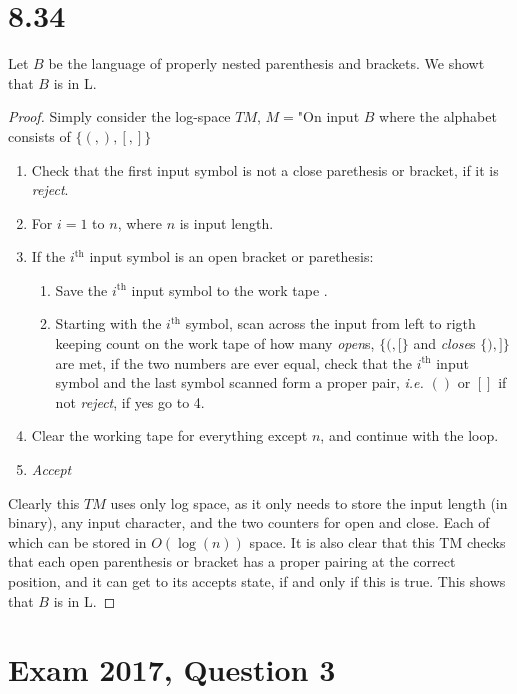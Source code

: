 \documentclass[a4paper,11pt]{article}
\newcommand{\ie}{\emph{i.e.} }
\numberwithin{equation}{section}
\begin{document}
	\section*{8.34} 
	Let $ B $ be the language of properly nested parenthesis and brackets. We showt that $ B $ is in L.
	\begin{proof}
	Simply consider the log-space $ TM $, $ M= $"On input $ B $ where the alphabet consists of $ \{(,),[,]\} $
	\renewcommand{\labelenumii}{(\roman{enumii})}
	\begin{enumerate}
		\item Check that the first input symbol is not a close parethesis or bracket, if it is \emph{reject}.
		\item For $ i=1 $ to $ n $, where $ n $ is input length.
		\item\quad If the $ i^{\text{th}} $ input symbol is an open bracket or parethesis: 
		\begin{addmargin}[2em]{0em} 
		\begin{enumerate}
				\item Save the $ i^{\text{th}} $ input symbol to the work tape .
				\item Starting with the $ i^{\text{th}} $ symbol, scan across the input from left to rigth keeping count on the work tape of how many \emph{open}s, $ \{(,[ \} $ and \emph{close}s $ \{),]\} $ are met, if the two numbers are ever equal, check that the $ i^{\text{th}} $ input symbol and the last symbol scanned form a proper pair, \ie $ () $ or $ [] $ if not \emph{reject}, if yes go to 4.
		\end{enumerate}
	\end{addmargin}
		\item \quad Clear the working tape for everything except $ n $, and continue with the loop.
		\item \emph{Accept}
	\end{enumerate}
	Clearly this $ TM $ uses only log space, as it only needs to store the input length (in binary), any input character, and the two counters for open and close. Each of which can be stored in $ O(\log(n)) $ space. It is also clear that this TM checks that each open parenthesis or bracket has a proper pairing at the correct position, and it can get to its accepts state, if and only if this is true. This shows that $ B $ is in L.
\end{proof}
\section*{Exam 2017, Question 3}
\end{document}
